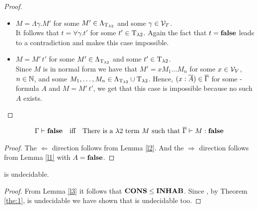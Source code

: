 \begin{proof}
\begin{itemize}
	\item[] \underline{$M=\Lambda\gamma.M'$} for some $M'\in\Lambda_{\text{T}_{\lambda2}}$ and some $\gamma\in\mathcal{V}_T$.\\ %
		It follows that $t=\forall\gamma.t'$ for some $t'\in\text{T}_{\lambda2}$. Again the fact that $t=\textbf{false}$ leads to a contradiction and makes this case impossible.
		

	\item[] \underline{$M=M'\,t'$} for some $M'\in\Lambda_{\text{T}_{\lambda2}}$ and some $t'\in\text{T}_{\lambda2}$.\\
		Since $M$ is in normal form we have that $M'=xM_1\dots M_n$ for some $x\in\mathcal{V}_V$, $n\in\mathbb{N}$, and some $M_1,\dots,M_n\in\Lambda_{\text{T}_{\lambda2}}\cup\text{T}_{\lambda2}$.
		Hence, $(x:\overline{A})\in\overline{\Gamma}$ for some \SysP-formula $A$ and $M=M'\,t'$, we get that this case is impossible because no such $A$ exists.
		
		
		
\end{itemize}
\end{proof}

\begin{lemma}\label{l3}
\begin{align*}
\Gamma\vdash\textbf{false}&&\text{iff}&&\text{There is a $\lambda2$ term $M$ such that } \overline{\Gamma}\vdash M:\textbf{false}
\end{align*}
\end{lemma}
\begin{proof}
The $\Leftarrow$ direction follows from Lemma %
\ref{l2}. And the $\Rightarrow$ direction follows from Lemma \ref{l1} with $A=\textbf{false}$.
\end{proof}

\begin{theorem}
\lambdaInhab{} is undecidable.
\end{theorem}
\begin{proof}
From Lemma \ref{l3} it follows that $\textbf{CONS}\leq\textbf{INHAB}$. Since , by Theorem \ref{the:1}, \PCons{} is undecidable we have shown that \lambdaInhab{} is undecidable too.
\end{proof}